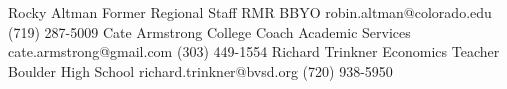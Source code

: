 %
%
%


\begin{referees}
		{Rocky Altman}
		{Former Regional Staff}
		{RMR BBYO}
		{robin.altman@colorado.edu}
		{(719) 287-5009}
		{Cate Armstrong}
		{College Coach}
		{Academic Services}
		{cate.armstrong@gmail.com}
		{(303) 449-1554}
        {Richard Trinkner}
        {Economics Teacher}
        {Boulder High School}
        {richard.trinkner@bvsd.org}
        {(720) 938-5950}
\end{referees}